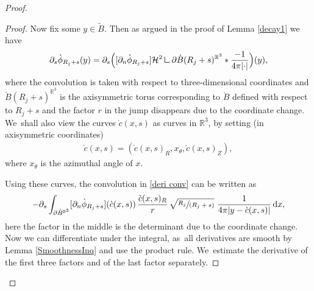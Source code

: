 \documentclass[10pt]{amsart}
\newcommand{\spfrac}[2]{\sfrac{#1}{(#2)}}
\theoremstyle{definition}
\newcommand\R{\mathbb{R}}
\newcommand\eq{=}
\newcommand\dd{\,\mathrm{d}}
\newcommand\dx{\dd x}
\newcommand{\mres}{\mathbin{\vrule height 1.6ex depth 0pt width
0.13ex\vrule height 0.13ex depth 0pt width 1.3ex}}
\let\de\partial
\begin{document}
\begin{proof}
\begin{proof}
Now fix some $y\in \tilde{B}$. Then as argued in the proof of Lemma \ref{decay1} we have
\begin{align}\label{deri conv}
\de_{s}\grave{\phi}_{R_j+s}(y)\eq \de_s\Bigl([\de_n\grave{\phi}_{R_j+s}]\mathcal{H}^2\mres\de\grave{B}(R_j+s)^{\R^3}*\frac{-1}{4\pi|{\cdot}|}\Bigr)(y),
\end{align}
where the convolution is taken with respect to three-dimensional coordinates and $\grave{B}(R_j+s)^{\R^3}$ is the axisymmetric torus corresponding to $\grave{B}$ defined with respect to $R_j+s$ and the factor $r$ in the jump disappears due to the coordinate change. We~shall also view the curves $\grave{c}(x,s)$ as curves in $\R^3$, by setting (in axisymmetric coordinates)
\begin{align*}
\grave{c}(x,s)\eq(\grave{c}(x,s)_R,x_\theta,\grave{c}(x,s)_Z),
\end{align*}
where $x_\theta$ is the azimuthal angle of $x$.

Using these curves, the convolution in \eqref{deri conv} can be written as
\begin{align*}
-\de_s\int_{\de\grave{B}^{\R^3}}[\de_n\grave{\phi}_{R_j+s}](\grave{c}(x,s))\,\frac{\grave{c}(x,s)_R}{r}\,\sqrt{\spfrac{R_j}{R_j+s}}\,\,\frac{1}{4\pi|y-\grave{c}(x,s)|}\dx,
\end{align*}
here the factor in the middle is the determinant due to the coordinate change. Now we can differentiate under the integral, as~all derivatives are smooth by Lemma \ref{SmoothnessInq} and use the product rule. We~estimate the derivative of the first three factors and of the last factor separately.


\end{proof}
\end{proof}
\end{document}
